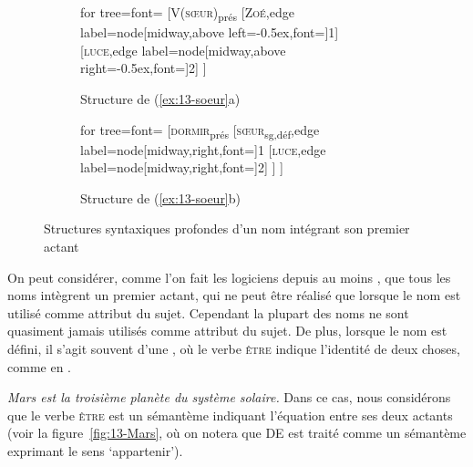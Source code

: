\begin{figure}
	\begin{subfigure}[b]{0.5\textwidth}
		\centering
		\begin{forest} for tree={font=\normalfont}
			[V(\textsc{sœur})\textsubscript{prés}
				[\textsc{Zoé},edge label={node[midway,above left=-0.5ex,font=\footnotesize]{1}}]
				[\textsc{luce},edge label={node[midway,above right=-0.5ex,font=\footnotesize]{2}}]
			]
		\end{forest}
		\caption{Structure de (\ref{ex:13-soeur}a)}
	\end{subfigure}%
	\hfill
	\begin{subfigure}[b]{0.5\textwidth}
		\centering
		\begin{forest} for tree={font=\normalfont}
			[\textsc{dormir}\textsubscript{prés}
			[\textsc{sœur}\textsubscript{sg,déf},edge label={node[midway,right,font=\footnotesize]{1}}
			[\textsc{luce},edge label={node[midway,right,font=\footnotesize]{2}}]
			]
			]
		\end{forest}
		\caption{Structure de (\ref{ex:13-soeur}b)}
	\end{subfigure}
\caption{Structures syntaxiques profondes d’un nom intégrant son premier actant\label{fig:13-soeur-synt}}
\end{figure}

On peut considérer, comme l’on fait les logiciens depuis au moins \citet{frege1892uber}, que tous les noms intègrent un premier actant, qui ne peut être réalisé que lorsque le nom est utilisé comme attribut du sujet. Cependant la plupart des noms ne sont quasiment jamais utilisés comme attribut du sujet. De plus, lorsque le nom est défini, il s’agit souvent d’une , où le verbe \textsc{être} indique l’identité de deux choses, comme en . 

\ea\label{ex:13-Mars} \textit{Mars est la troisième planète du système solaire.}\z
Dans ce cas, nous considérons que le verbe \textsc{être} est un sémantème indiquant l'équation entre ses deux actants (voir la figure~\ref{fig:13-Mars}, où on notera que DE est traité comme un sémantème exprimant le sens ‘appartenir’).

